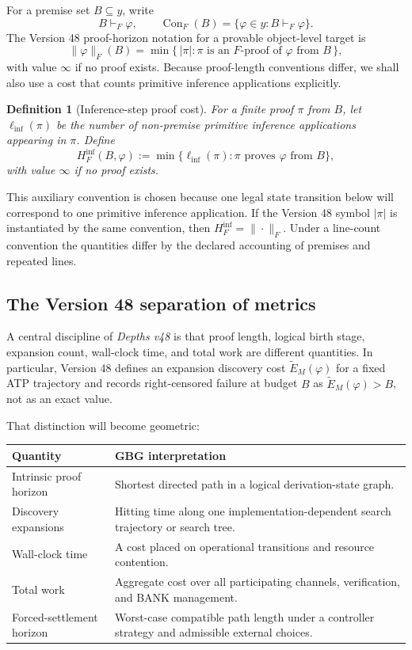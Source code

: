 \documentclass[11pt]{article}
\newtheorem{definition}{Definition}[section]
\theoremstyle{remark}
\newcommand{\Con}{\operatorname{Con}}
\newcommand{\infstep}{\ell_{\mathrm{inf}}}
\begin{document}
For a premise set $B\subseteq y$, write
\[
B\vdash_F\varphi,
\qquad
\Con_F(B)=\{\varphi\in y:B\vdash_F\varphi\}.
\]
The Version 48 proof-horizon notation for a provable object-level target is
\[
\|\varphi\|_F(B)
=
\min\{\,|\pi|:\pi\text{ is an }F\text{-proof of }\varphi\text{ from }B\,\},
\]
with value $\infty$ if no proof exists. Because proof-length conventions differ, we shall also use a cost that counts primitive inference applications explicitly.

\begin{definition}[Inference-step proof cost]
For a finite proof $\pi$ from $B$, let $\infstep(\pi)$ be the number of non-premise primitive inference applications appearing in $\pi$. Define
\[
H_F^{\mathrm{inf}}(B,\varphi)
:=
\min\{\infstep(\pi):\pi\text{ proves }\varphi\text{ from }B\},
\]
with value $\infty$ if no proof exists.
\end{definition}

This auxiliary convention is chosen because one legal state transition below will correspond to one primitive inference application. If the Version 48 symbol $|\pi|$ is instantiated by the same convention, then $H_F^{\mathrm{inf}}=\|\cdot\|_F$. Under a line-count convention the quantities differ by the declared accounting of premises and repeated lines.

\subsection{The Version 48 separation of metrics}

A central discipline of \emph{Depths v48} is that proof length, logical birth stage, expansion count, wall-clock time, and total work are different quantities. In particular, Version 48 defines an expansion discovery cost $\widetilde E_M(\varphi)$ for a fixed ATP trajectory and records right-censored failure at budget $B$ as $\widetilde E_M(\varphi)>B$, not as an exact value.

That distinction will become geometric:
\begin{center}
\begin{tabular}{p{}p{}}
\toprule
\textbf{Quantity} & \textbf{GBG interpretation}\\
\midrule
Intrinsic proof horizon & Shortest directed path in a logical derivation-state graph.\\
Discovery expansions & Hitting time along one implementation-dependent search trajectory or search tree.\\
Wall-clock time & A cost placed on operational transitions and resource contention.\\
Total work & Aggregate cost over all participating channels, verification, and BANK management.\\
Forced-settlement horizon & Worst-case compatible path length under a controller strategy and admissible external choices.\\
\bottomrule
\end{tabular}
\end{center}
\end{document}
